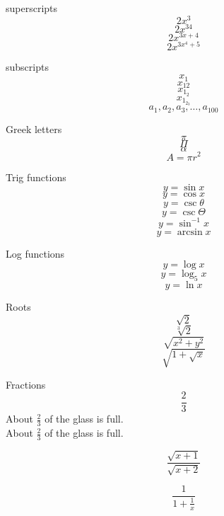 \documentclass[11pt]{article}
\begin{document}
superscripts
$$2x^3$$
$$2x^{34}$$
$$2x^{3x+4}$$
$$2x^{3x^4 + 5}$$

subscripts
$$x_1$$
$$x_{12}$$
$$x_{1_2}$$
$$x_{1_{2_3}}$$
$$a_1, a_2, a_3, \ldots, a_{100}$$

Greek letters
$$\pi$$
$$\Pi$$
$$\alpha$$
$$A=\pi r^2$$

Trig functions
$$y = \sin x$$
$$y = \cos x$$
$$y = \csc \theta$$
$$y = \csc \Theta$$
$$y = \sin^{-1} x$$
$$y = \arcsin x$$

Log functions
$$y = \log x$$
$$y = \log_5 x$$
$$y = \ln x$$

Roots
$$\sqrt{2}$$
$$\sqrt[3]{2}$$
$$\sqrt{x^2 + y^2}$$
$$\sqrt{ 1  + \sqrt{x} }$$

Fractions
$$\frac{2}{3}$$
About $\frac{2}{3}$ of the glass is full.\\[16pt]
About $\displaystyle \frac{2}{3}$ of the glass is full.

$$\frac{\sqrt{x + 1}}{\sqrt{x + 2}}$$

$$\frac{1}{    1 + \frac{1}{x}    }$$
\end{document}
